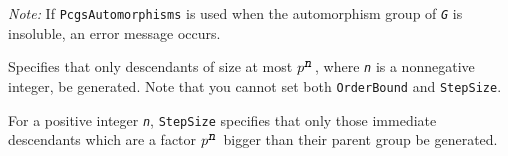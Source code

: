 \documentclass[a4paper,11pt]{report}
\begin{document}
{{\begin{description}
 \emph{Note:} If \texttt{PcgsAutomorphisms} is used when the automorphism group of \mbox{\texttt{\mdseries\slshape G}} is insoluble, an error message occurs. 
\item[{\texttt{OrderBound := \mbox{\texttt{\mdseries\slshape n}}} \label{option OrderBound}\index{option OrderBound}}]  Specifies that only descendants of size at most $p^{\mbox{\texttt{\mdseries\slshape n}}}$, where \mbox{\texttt{\mdseries\slshape n}} is a non\texttt{}negative integer, be generated. Note that you
cannot set both \texttt{OrderBound} and \texttt{StepSize}. 
\item[{\texttt{StepSize := \mbox{\texttt{\mdseries\slshape n}}} \label{option StepSize}\index{option StepSize}}] 
\item[{\texttt{StepSize := \mbox{\texttt{\mdseries\slshape list}}}  }]  For a positive integer \mbox{\texttt{\mdseries\slshape n}}, \texttt{StepSize} specifies that only those immediate descendants which are a factor $p^{\mbox{\texttt{\mdseries\slshape n}}}$ bigger than their parent group be generated. 


\end{description}}}
\end{document}

